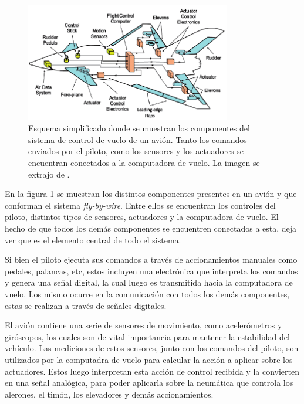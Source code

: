 \begin{figure}[htb]
    \centering
    \includegraphics[width=0.8\textwidth]{img/avion_FBW.png}
    \caption{Esquema simplificado donde se muestran los componentes del sistema de control de vuelo de un avión. Tanto los comandos enviados por el piloto, como los sensores y los actuadores se encuentran conectados a la computadora de vuelo. La imagen se extrajo de \cite{collinson2023introduction}.}
    \label{fig:avion_FBW}
\end{figure}


En la figura \ref{fig:avion_FBW} se muestran los distintos componentes presentes en un avión y que conforman el sistema \textit{fly-by-wire}. Entre ellos se encuentran los controles del piloto, distintos tipos de sensores, actuadores y la computadora de vuelo. El hecho de que todos los demás componentes se encuentren conectados a esta, deja ver que es el elemento central de todo el sistema. 

Si bien el piloto ejecuta sus comandos a través de accionamientos manuales como pedales, palancas, etc, estos incluyen una electrónica que interpreta los comandos y genera una señal digital, la cual luego es transmitida hacia la computadora de vuelo. Los mismo ocurre en la comunicación con todos los demás componentes, estas se realizan a través de señales digitales.

El avión contiene una serie de sensores de movimiento, como acelerómetros y giróscopos, los cuales son de vital importancia para mantener la estabilidad del vehículo. Las mediciones de estos sensores, junto con los comandos del piloto, son utilizados por la computadra de vuelo para calcular la acción a aplicar sobre los actuadores. Estos luego interpretan esta acción de control recibida y la convierten en una señal analógica, para poder aplicarla sobre la neumática que controla los alerones, el timón, los elevadores y demás accionamientos. %


